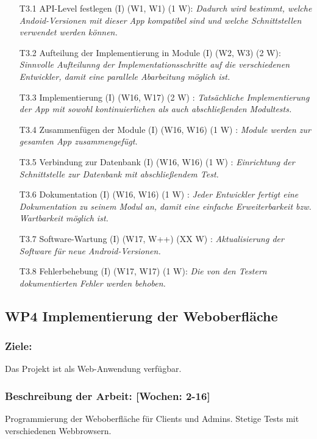 \documentclass{report}
\begin{document}
\begin{enumerate}
\item [T3.1] API-Level festlegen (I) (W1, W1) (1 W): \emph{ Dadurch wird bestimmt, welche Andoid-Versionen mit dieser App kompatibel sind und welche Schnittstellen verwendet werden können.}
\item [T3.2] Aufteilung der Implementierung in Module (I) (W2, W3) (2 W): \emph{ Sinnvolle Aufteilunng der Implementationsschritte auf die verschiedenen Entwickler, damit eine parallele Abarbeitung möglich ist.}
\item [T3.3] Implementierung (I) (W16, W17) (2 W) : \emph{ Tatsächliche Implementierung der App mit sowohl kontinuierlichen als auch abschließenden Modultests.}
\item [T3.4] Zusammenfügen der Module (I) (W16, W16) (1 W) : \emph{ Module werden zur gesamten App zusammengefügt.}
\item [T3.5] Verbindung zur Datenbank (I) (W16, W16) (1 W) : \emph{ Einrichtung der Schnittstelle zur Datenbank mit abschließendem Test.}
\item [T3.6] Dokumentation (I) (W16, W16) (1 W) : \emph{ Jeder Entwickler fertigt eine Dokumentation zu seinem Modul an, damit eine einfache Erweiterbarkeit bzw. Wartbarkeit möglich ist.}
\item [T3.7] Software-Wartung (I) (W17, W++) (XX W) : \emph{ Aktualisierung der Software für neue Android-Versionen.}
\item [T3.8] Fehlerbehebung (I) (W17, W17) (1 W): \emph{Die von den Testern dokumentierten Fehler werden behoben.}
\end{enumerate}

\subsection*{WP4 Implementierung der Weboberfläche}

\subsubsection{Ziele:} Das Projekt ist als Web-Anwendung verfügbar.
\subsubsection{Beschreibung der Arbeit: [Wochen: 2-16]} Programmierung der Weboberfläche für Clients und Admins. Stetige Tests mit verschiedenen Webbrowsern.
\end{document}
